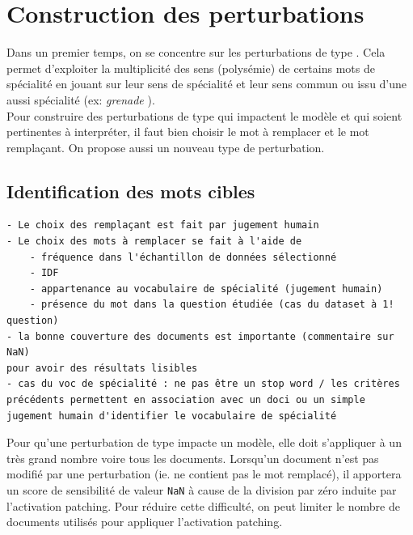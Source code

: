 \section{Construction des perturbations}

    Dans un premier temps, on se concentre sur les perturbations de type \replace. Cela permet d'exploiter la multiplicité des sens (polysémie) de certains mots de spécialité en jouant sur leur sens de spécialité et leur sens commun ou issu d'une aussi spécialité (ex: \textit{grenade} ). \\
    Pour construire des perturbations de type \replace qui impactent le modèle et qui soient pertinentes à interpréter, il faut bien choisir le mot à remplacer et le mot remplaçant. On propose aussi un nouveau type de perturbation.

    \subsection{Identification des mots cibles}
        \begin{verbatim}
- Le choix des remplaçant est fait par jugement humain
- Le choix des mots à remplacer se fait à l'aide de 
    - fréquence dans l'échantillon de données sélectionné
    - IDF 
    - appartenance au vocabulaire de spécialité (jugement humain)
    - présence du mot dans la question étudiée (cas du dataset à 1! question)
- la bonne couverture des documents est importante (commentaire sur NaN) 
pour avoir des résultats lisibles
- cas du voc de spécialité : ne pas être un stop word / les critères précédents permettent en association avec un doci ou un simple jugement humain d'identifier le vocabulaire de spécialité
        \end{verbatim}

        Pour qu'une perturbation de type \replace impacte un modèle, elle doit s'appliquer à un très grand nombre voire tous les documents. Lorsqu'un document n'est pas modifié par une perturbation (ie. ne contient pas le mot remplacé), il apportera un score de sensibilité de valeur \texttt{NaN} à cause de la division par zéro induite par l'activation patching. Pour réduire cette difficulté, on peut limiter le nombre de documents utilisés pour appliquer l'activation patching.

